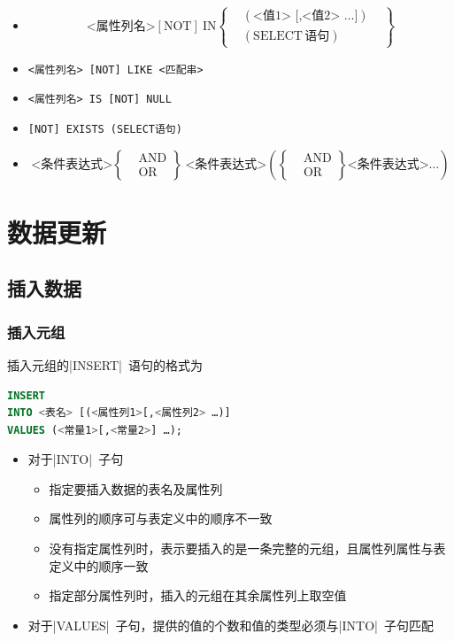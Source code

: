 \begin{itemize}
\begin{itemize}
        \item $$\mbox{<属性列名>} \mathrm{[NOT]\ IN}\left\{
            \begin{aligned}
            & (\mbox{<值1> \ [,<值2> …]}) & \\
            & (\mathrm{SELECT}\, \mbox{语句})
            \end{aligned}
            \right\}$$
        \item \verb|<属性列名> [NOT] LIKE <匹配串>|
        \item \verb|<属性列名> IS [NOT] NULL|
        \item \verb|[NOT] EXISTS (SELECT语句)|
        \item $$\mbox{<条件表达式>} \left\{
            \begin{aligned}
            &\mathrm{AND}  \\
            &\mathrm{OR}
            \end{aligned}
            \right\}\ \mbox{<条件表达式>} \left( \left\{
            \begin{aligned}
            &\mathrm{AND}  \\
            &\mathrm{OR}
            \end{aligned}
            \right\}\mbox{<条件表达式>}… \right)$$
    \end{itemize}
\end{itemize}


\section{数据更新}

\subsection{插入数据}

\subsubsection{插入元组}
插入元组的\sverb|INSERT|\ 语句的格式为
\begin{lstlisting}[language=sql]
INSERT
INTO <表名> [(<属性列1>[,<属性列2> …)]
VALUES (<常量1>[,<常量2>] …);  
\end{lstlisting}

\begin{itemize}
    \item 对于\sverb|INTO|\ 子句
    \begin{itemize}
        \item 指定要插入数据的表名及属性列
        \item 属性列的顺序可与表定义中的顺序不一致
        \item 没有指定属性列时，表示要插入的是一条完整的元组，且属性列属性与表定义中的顺序一致
        \item 指定部分属性列时，插入的元组在其余属性列上取空值
    \end{itemize}
    \item 对于\sverb|VALUES|\ 子句，提供的值的个数和值的类型必须与\sverb|INTO|\ 子句匹配
\end{itemize}

